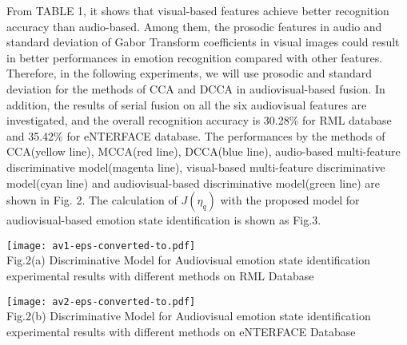 \documentclass[10pt,journal,compsoc]{IEEEtran}
\begin{document}
From TABLE 1, it shows that visual-based features achieve better recognition accuracy than audio-based. Among them, the prosodic features in audio and standard deviation of Gabor Transform coefficients in visual images could result in better performances in emotion recognition compared with other features. Therefore, in the following experiments, we will use prosodic and standard deviation for the methods of CCA and DCCA in audiovisual-based fusion. In addition, the results of serial fusion on all the six audiovisual features are investigated, and the overall recognition accuracy is 30.28\% for RML database and 35.42\% for eNTERFACE database. The performances by the methods of CCA(yellow line), MCCA(red line), DCCA(blue line), audio-based multi-feature discriminative model(magenta line), visual-based multi-feature discriminative model(cyan line) and audiovisual-based discriminative model(green line) are shown in Fig. 2. The calculation of $J(\eta_q)$ with the proposed model for audiovisual-based emotion state identification is shown as Fig.3.
\begin{figure*}[t]
\centering
\texttt{[image: av1-eps-converted-to.pdf]}\\ Fig.2(a) Discriminative Model for Audiovisual emotion state identification experimental results with different methods on RML Database\\
\end{figure*}
\begin{figure*}[t]
\centering
\texttt{[image: av2-eps-converted-to.pdf]}\\ Fig.2(b) Discriminative Model for Audiovisual emotion state identification experimental results with different methods on eNTERFACE Database\\
\end{figure*}
\end{document}
